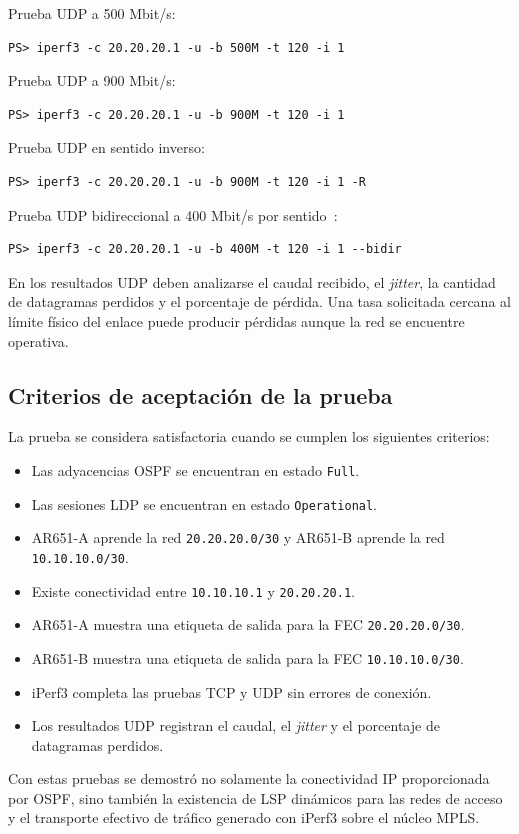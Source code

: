 Prueba UDP a 500 Mbit/s:

\begin{lstlisting}[style=terminal]
PS> iperf3 -c 20.20.20.1 -u -b 500M -t 120 -i 1
\end{lstlisting}

Prueba UDP a 900 Mbit/s:

\begin{lstlisting}[style=terminal]
PS> iperf3 -c 20.20.20.1 -u -b 900M -t 120 -i 1
\end{lstlisting}

Prueba UDP en sentido inverso:

\begin{lstlisting}[style=terminal]
PS> iperf3 -c 20.20.20.1 -u -b 900M -t 120 -i 1 -R
\end{lstlisting}

Prueba UDP bidireccional a 400 Mbit/s por sentido~\cite{esnet-iperf3-manual}:

\begin{lstlisting}[style=terminal]
PS> iperf3 -c 20.20.20.1 -u -b 400M -t 120 -i 1 --bidir
\end{lstlisting}

En los resultados UDP deben analizarse el caudal recibido, el
\textit{jitter}, la cantidad de datagramas perdidos y el porcentaje de
pérdida. Una tasa solicitada cercana al límite físico del enlace puede
producir pérdidas aunque la red se encuentre operativa.

\subsection{Criterios de aceptación de la prueba}

La prueba se considera satisfactoria cuando se cumplen los siguientes
criterios:

\begin{itemize}
    \item Las adyacencias OSPF se encuentran en estado \texttt{Full}.
    \item Las sesiones LDP se encuentran en estado \texttt{Operational}.
    \item AR651-A aprende la red \texttt{20.20.20.0/30} y AR651-B aprende la red
          \texttt{10.10.10.0/30}.
    \item Existe conectividad entre \texttt{10.10.10.1} y
          \texttt{20.20.20.1}.
    \item AR651-A muestra una etiqueta de salida para la FEC
          \texttt{20.20.20.0/30}.
    \item AR651-B muestra una etiqueta de salida para la FEC
          \texttt{10.10.10.0/30}.
    \item iPerf3 completa las pruebas TCP y UDP sin errores de conexión.
    \item Los resultados UDP registran el caudal, el \textit{jitter} y el
          porcentaje de datagramas perdidos.
\end{itemize}

Con estas pruebas se demostró no solamente la conectividad IP proporcionada
por OSPF, sino también la existencia de LSP dinámicos para las redes de
acceso y el transporte efectivo de tráfico generado con iPerf3 sobre el
núcleo MPLS.

\endgroup
